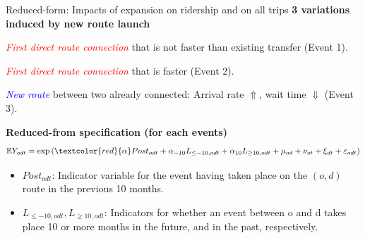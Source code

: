 \documentclass[notes,11pt, aspectratio=169]{beamer}
\newenvironment{wideitemize}{\itemize\addtolength{\itemsep}{0.4em}}{\enditemize}
\begin{document}
\begin{frame}{Reduced-form: Impacts of expansion on ridership and on all trips}
	\textbf{3 variations induced by new route launch}
	\begin{wideitemize}
	\item \textcolor{red}{\textit{First direct route connection}} that is not faster than existing transfer (Event 1).
	\item \textcolor{red}{\textit{First direct route connection}} that is faster (Event 2).
	\item \textcolor{blue}{\textit{New route}} between two already connected: Arrival rate $\Uparrow$, wait time $\Downarrow$ (Event 3).
	\end{wideitemize}\vspace{1em}

	\textbf{Reduced-from specification (for each events)}
	\begin{align}
		\mathbb{E}Y_{odt} = \exp \left( \textcolor{red}{\alpha} Post_{odt} + \alpha_{-10} L_{\leq -10, odt} + \alpha_{10}L_{\geq 10,odt} + \mu_{od} + \nu_{ot} + \xi_{dt} + \varepsilon_{odt} \right) 		\nonumber
	\end{align}\vspace{-1em}
	\begin{itemize}
		\item $Post_{odt}$: Indicator variable for the event having taken place on the $(o,d)$ route in the previous 10 months.
		\item $L_{\leq -10, odt}, L_{\geq 10,odt}$: Indicators for whether an event between o and d takes place 10 or more months in the future, and in the past, respectively. 
	\end{itemize}
\end{frame}
\end{document}
